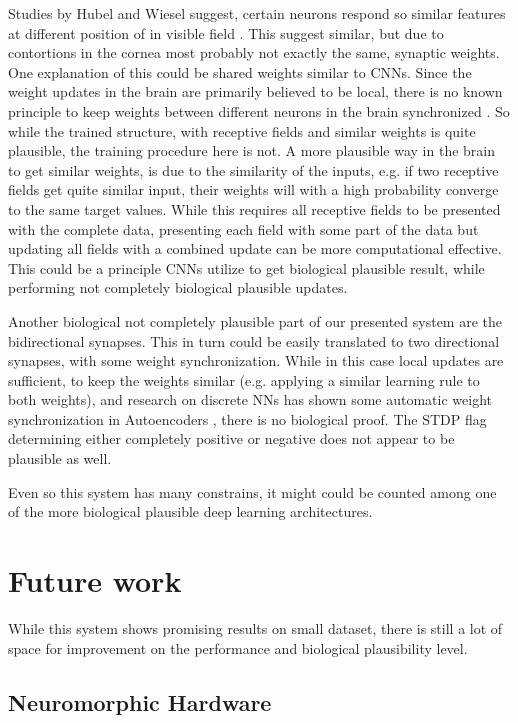 Studies by Hubel and Wiesel suggest, certain neurons respond so similar features at different position of in visible field \cite{Hubel1959}.
This suggest similar, but due to contortions in the cornea most probably not exactly the same, synaptic weights. 
One explanation of this could be shared weights similar to CNNs. 
Since the weight updates in the brain are primarily believed to be local, there is no known principle to keep weights between different neurons in the brain synchronized \cite{DBLP:journals/corr/ScellierB16}.
So while the trained structure, with receptive fields and similar weights is quite plausible, the training procedure here is not.
A more plausible way in the brain to get similar weights, is due to the similarity of the inputs, e.g. if two receptive fields get quite similar input, their weights will with a high probability converge to the same target values.  
While this requires all receptive fields to be presented with the complete data, presenting each field with some part of the data but updating all fields with a combined update can be more computational effective. 
This could be a principle CNNs utilize to get biological plausible result, while performing not completely biological plausible updates.

Another biological not completely plausible part of our presented system are the bidirectional synapses.
This in turn could be easily translated to two directional synapses, with some weight synchronization. 
While in this case local updates are sufficient, to keep the weights similar (e.g. applying a similar learning rule to both weights), and research on discrete NNs has shown some automatic weight synchronization in Autoencoders \cite{vincent2010stacked}, there is no biological proof.
The STDP flag determining either completely positive or negative does not appear to be plausible as well.

Even so this system has many constrains, it might could be counted among one of the more biological plausible deep learning architectures.     

\section{Future work}

While this system shows promising results on small dataset, there is still a lot of space for improvement on the performance and biological plausibility level.

\subsection{Neuromorphic Hardware}

